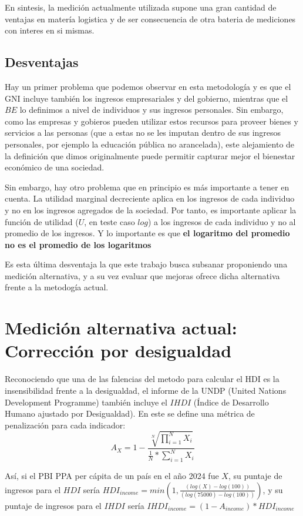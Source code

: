 En sintesis, la medición actualmente utilizada supone una gran cantidad de ventajas en matería logistica y de ser consecuencia de otra bateria de mediciones con interes en si mismas.

\subsection{Desventajas}

Hay un primer problema que podemos observar en esta metodología y es que el GNI incluye también los ingresos empresariales y del gobierno, mientras que el $BE$ lo definimos a nivel de individuos y sus ingresos personales. Sin embargo, como las empresas y gobieros pueden utilizar estos recursos para proveer bienes y servicios a las personas (que a estas no se les imputan dentro de sus ingresos personales, por ejemplo la educación pública no arancelada), este alejamiento de la definición que dimos originalmente puede permitir capturar mejor el bienestar económico de una sociedad. 

Sin embargo, hay otro problema que en principio es más importante a tener en cuenta. La utilidad marginal decreciente aplica en los ingresos de cada individuo y no en los ingresos agregados de la sociedad. Por tanto, es importante aplicar la función de utilidad ($U$, en teste caso $log$) a los ingresos de cada individuo y no al promedio de los ingresos. Y lo importante es que \textbf{el logaritmo del promedio no es el promedio de los logaritmos}

Es esta última desventaja la que este trabajo busca subsanar proponiendo una medición alternativa, y a su vez evaluar que mejoras ofrece dicha alternativa frente a la metodogía actual.

\section{Medición alternativa actual: Corrección por desigualdad}

Reconociendo que una de las falencias del metodo para calcular el HDI es la insensibilidad frente a la desigualdad, el informe de la UNDP (United Nations Development Programme) también incluye el $IHDI$ (Índice de Desarrollo Humano ajustado por Desigualdad). En este se define una métrica de penalización para cada indicador:
$$
    A_X = 1 - \frac{\sqrt[N]{\prod_{i=1}^NX_i}}{\frac{1}{N} * \sum_{i=1}^N X_i}
$$

Así, si el PBI PPA per cápita de un país en el año 2024 fue $X$, su puntaje de ingresos para el $HDI$ sería $ HDI_{income} = min(1, \frac{(log(X)-log(100))}{(log(75000)-log(100))})$, y su puntaje de ingresos para el $IHDI$ sería $IHDI_{income} = (1-A_{income}) * HDI_{income}$

